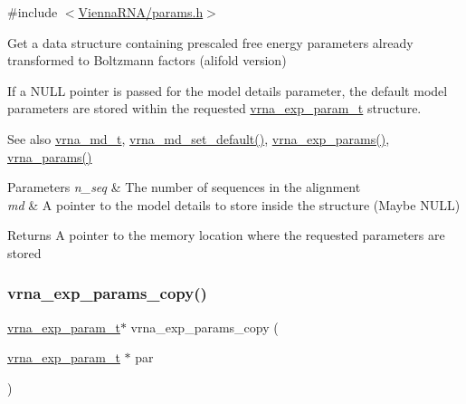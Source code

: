 {\ttfamily \#include $<$\hyperlink{params_8h}{Vienna\+R\+N\+A/params.\+h}$>$}



Get a data structure containing prescaled free energy parameters already transformed to Boltzmann factors (alifold version) 

If a N\+U\+LL pointer is passed for the model details parameter, the default model parameters are stored within the requested \hyperlink{group__energy__parameters_ga01d8b92fe734df8d79a6169482c7d8d8}{vrna\+\_\+exp\+\_\+param\+\_\+t} structure.

\begin{DoxySeeAlso}{See also}
\hyperlink{group__model__details_ga1f8a10e12a0a1915f2a4eff0b28ea17c}{vrna\+\_\+md\+\_\+t}, \hyperlink{group__model__details_ga8ac6ff84936282436f822644bf841f66}{vrna\+\_\+md\+\_\+set\+\_\+default()}, \hyperlink{group__energy__parameters_gab1f3016f96aa96bff020cdd904605afa}{vrna\+\_\+exp\+\_\+params()}, \hyperlink{group__energy__parameters_gad0e3e7e74bdc50d1709d40c92993185e}{vrna\+\_\+params()}
\end{DoxySeeAlso}

\begin{DoxyParams}{Parameters}
{\em n\+\_\+seq} & The number of sequences in the alignment \\
\hline
{\em md} & A pointer to the model details to store inside the structure (Maybe N\+U\+LL) \\
\hline
\end{DoxyParams}
\begin{DoxyReturn}{Returns}
A pointer to the memory location where the requested parameters are stored 
\end{DoxyReturn}
\mbox{\label{group__energy__parameters_ga70bc46be7cfa5434a71efe241c4f0609}} 
\subsubsection{\texorpdfstring{vrna\+\_\+exp\+\_\+params\+\_\+copy()}{vrna\_exp\_params\_copy()}}
{\footnotesize\ttfamily \hyperlink{group__energy__parameters_ga01d8b92fe734df8d79a6169482c7d8d8}{vrna\+\_\+exp\+\_\+param\+\_\+t}$\ast$ vrna\+\_\+exp\+\_\+params\+\_\+copy (\begin{DoxyParamCaption}\item[{\hyperlink{group__energy__parameters_ga01d8b92fe734df8d79a6169482c7d8d8}{vrna\+\_\+exp\+\_\+param\+\_\+t} $\ast$}]{par }\end{DoxyParamCaption})}



